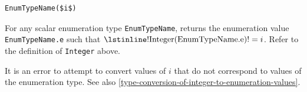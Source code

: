 \begin{operatordefinition*}[<EnumTypeName>]\label{modelica:enumeration-of-integer}
\begin{synopsis}\begin{lstlisting}
EnumTypeName($i$)
\end{lstlisting}\end{synopsis}
\begin{semantics}
For any scalar enumeration type \lstinline!EnumTypeName!, returns the enumeration value \lstinline!EnumTypeName.e! such that $\text{\lstinline!Integer(EnumTypeName.e)!} = i$.
Refer to the definition of \lstinline!Integer! above.

It is an error to attempt to convert values of $i$ that do not correspond to values of the enumeration type.
See also \cref{type-conversion-of-integer-to-enumeration-values}.
\end{semantics}
\end{operatordefinition*}

